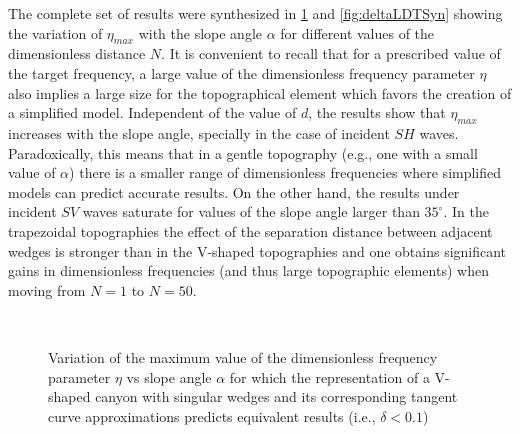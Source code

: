 \documentclass[11pt,letterpaper]{article}
\begin{document}
The complete set of results were synthesized in \cref{fig:deltaLDVSyn} and \cref{fig:deltaLDTSyn} showing the variation of $\eta_{max}$ with the slope angle $\alpha$ for different values of the dimensionless distance $N$. It is convenient to recall that for a prescribed value of the target frequency, a large value of the dimensionless frequency parameter $\eta$ also implies a large size for the topographical element which favors the creation of a simplified model. Independent of the value of $d$, the results show that $\eta_{max}$ increases with the slope angle, specially in the case of incident $SH$ waves. Paradoxically, this means that in a gentle topography (e.g., one with a small value of $\alpha$) there is a smaller range of dimensionless frequencies where simplified models can predict accurate results. On the other hand, the results under incident $SV$ waves saturate for values of the slope angle larger than $35^\circ$. In the trapezoidal topographies the effect of the separation distance between adjacent wedges is stronger than in the V-shaped topographies and one obtains significant gains in dimensionless frequencies (and thus large topographic elements) when moving from $N = 1$ to $N = 50$.

\begin{figure}[H]
	\centering
	\
	\hspace{-.25cm}
	\\
	\caption{Variation of the maximum value of the dimensionless frequency parameter $\eta$ vs slope angle $\alpha$ for which the representation of a V-shaped canyon with singular wedges and its corresponding tangent curve approximations predicts equivalent results (i.e., $\delta < 0.1$)}
	\label{fig:deltaLDVSyn}
\end{figure}
\end{document}
